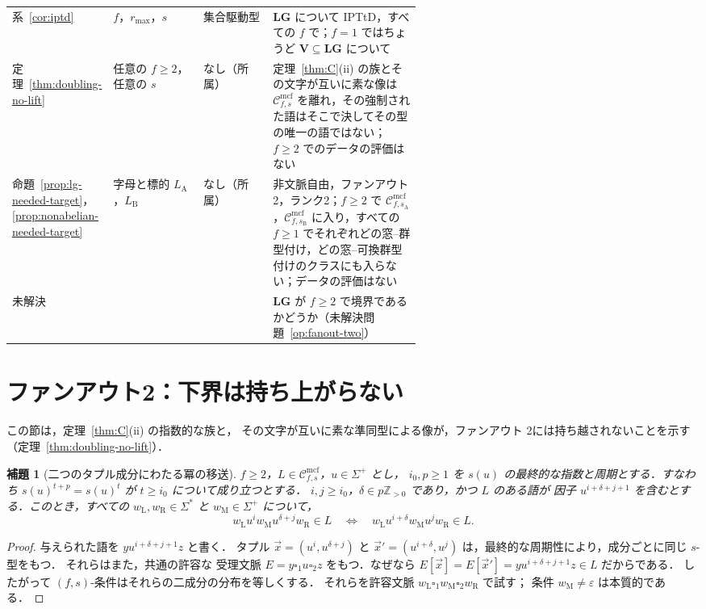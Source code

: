 \documentclass[11pt,a4paper]{ltjsarticle}
\numberwithin{equation}{section}
\theoremstyle{plain}
\newtheorem{lemma}[theorem]{補題}
\theoremstyle{definition}
\theoremstyle{remark}
\newcommand{\Cmcf}[2]{\mathcal{C}^{\mathrm{mcf}}_{#1,#2}}
\newcommand{\tuple}[1]{\vec{#1}}
\newcommand{\blank}{\square}
\newcommand{\eps}{\varepsilon}
\theoremstyle{plain}
\begin{document}
\begin{table}[htbp]
\begin{tabularx}{\linewidth}{@{}>{\raggedright\arraybackslash}p{0.2\linewidth}>{\raggedright\arraybackslash}p{0.22\linewidth}>{\raggedright\arraybackslash}p{0.17\linewidth}>{\raggedright\arraybackslash}X@{}}
系~\ref{cor:iptd}
 & $f$，$r_{\max}$，$s$
 & 集合駆動型
 & $\mathbf{LG}$ について IPTtD，すべての $f$ で；$f=1$ ではちょうど $\mathbf{V}\subseteq\mathbf{LG}$ について\\
定理~\ref{thm:doubling-no-lift}
 & 任意の $f\ge2$，任意の $s$
 & なし（所属）
  & 定理~\ref{thm:C}(ii) の族とその文字が互いに素な像は $\Cmcf{f}{s}$ を離れ，その強制された語はそこで決してその型の唯一の語ではない；$f\ge2$ でのデータの評価はない\\
命題~\ref{prop:lg-needed-target}，\ref{prop:nonabelian-needed-target}
 & 字母と標的 $L_{\mathrm A}$，$L_{\mathrm B}$
 & なし（所属）
 & 非文脈自由，ファンアウト2，ランク2；$f\ge2$ で $\Cmcf{f}{s_{\mathrm A}}$，$\Cmcf{f}{s_{\mathrm B}}$ に入り，すべての $f\ge1$ でそれぞれどの窓--群型付け，どの窓--可換群型付けのクラスにも入らない；データの評価はない\\
未解決
 & 
 & 
 & $\mathbf{LG}$ が $f\ge2$ で境界であるかどうか（未解決問題~\ref{op:fanout-two}）\\
\hline
\end{tabularx}
\end{table}

\section{ファンアウト2：下界は持ち上がらない}
\label{sec:fanout-two}
\label{subsec:power-transfer}

この節は，定理~\ref{thm:C}(ii) の指数的な族と，
その文字が互いに素な準同型による像が，ファンアウト
2には持ち越されないことを示す（定理~\ref{thm:doubling-no-lift}）．

\begin{lemma}[二つのタプル成分にわたる冪の移送]
\label{lem:power-transfer}
$f\ge2$，$L\in\Cmcf{f}{s}$，$u\in\Sigma^+$ とし，
$i_0,p\ge1$ を $s(u)$ の最終的な指数と周期とする．すなわち
$s(u)^{t+p}=s(u)^t$ が $t\ge i_0$ について成り立つとする．
$i,j\ge i_0$，$\delta\in p\mathbb Z_{>0}$ であり，かつ $L$ のある語が
因子 $u^{i+\delta+j+1}$ を含むとする．このとき，すべての
$w_{\mathrm L},w_{\mathrm R}\in\Sigma^*$ と $w_{\mathrm M}\in\Sigma^+$ について，
\[
 w_{\mathrm L}u^iw_{\mathrm M}u^{\delta+j}w_{\mathrm R}\in L\quad\Longleftrightarrow\quad
 w_{\mathrm L}u^{i+\delta}w_{\mathrm M}u^jw_{\mathrm R}\in L.
\]
\end{lemma}
\begin{proof}
与えられた語を $yu^{i+\delta+j+1}z$ と書く．
タプル $\tuple x=(u^i,u^{\delta+j})$ と
$\tuple x'=(u^{i+\delta},u^j)$ は，最終的な周期性により，成分ごとに同じ $s$-型をもつ．
それらはまた，共通の許容な
受理文脈 $E=y\blank_1u\blank_2z$ をもつ．なぜなら
$E[\tuple x]=E[\tuple x']=yu^{i+\delta+j+1}z\in L$ だからである．
したがって $(f,s)$-条件はそれらの二成分の分布を等しくする．
それらを許容文脈 $w_{\mathrm L}\blank_1w_{\mathrm M}\blank_2w_{\mathrm R}$ で試す；
条件 $w_{\mathrm M}\ne\eps$ は本質的である．
\end{proof}
\end{document}
